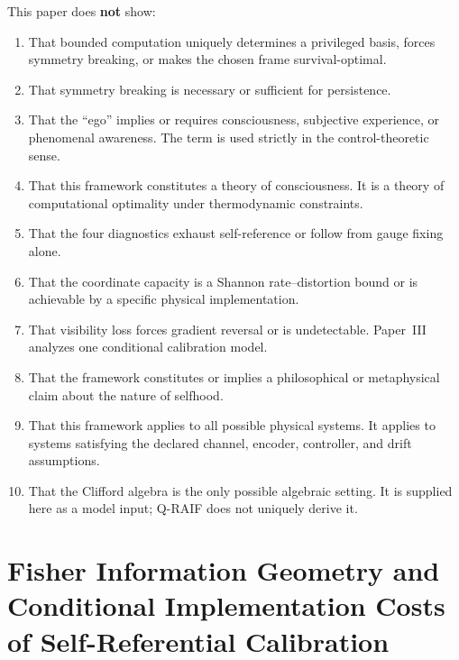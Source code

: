 \documentclass[12pt,a4paper,openany]{book}
\begin{document}
\medskip
This paper does \textbf{not} show:
\begin{enumerate}
\item That bounded computation uniquely determines a privileged basis,
  forces symmetry breaking, or makes the chosen frame survival-optimal.
\item That symmetry breaking is necessary or sufficient for persistence.
\item That the ``ego'' implies or requires consciousness,
  subjective experience, or phenomenal awareness.
  The term is used strictly in the control-theoretic sense.
\item That this framework constitutes a theory of
  consciousness. It is a theory of computational optimality
  under thermodynamic constraints.
\item That the four diagnostics exhaust self-reference or follow from
  gauge fixing alone.
\item That the coordinate capacity is a Shannon rate--distortion bound or
  is achievable by a specific physical implementation.
\item That visibility loss forces gradient reversal or is undetectable.
  Paper~III analyzes one conditional calibration model.
\item That the framework constitutes or implies a
  philosophical or metaphysical claim about the nature
  of selfhood.
\item That this framework applies to all possible physical
  systems. It applies to systems
  satisfying the declared channel, encoder, controller, and drift
  assumptions.
\item That the Clifford algebra is the only possible
  algebraic setting. It is supplied here as a model input; Q-RAIF does
  not uniquely derive it.
\end{enumerate}


\chapter{Fisher Information Geometry and Conditional Implementation Costs of Self-Referential Calibration}
\label{chap:paperIII}
\end{document}
